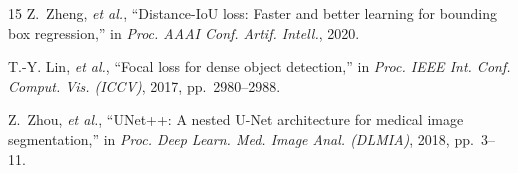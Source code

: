 \documentclass[conference]{IEEEtran}
\begin{document}
\begin{thebibliography}{15}
Z.~Zheng, \emph{et al.}, ``Distance-IoU loss: Faster and better learning for bounding box regression,'' in \emph{Proc. AAAI Conf. Artif. Intell.}, 2020.

T.-Y. Lin, \emph{et al.}, ``Focal loss for dense object detection,'' in \emph{Proc. IEEE Int. Conf. Comput. Vis. (ICCV)}, 2017, pp.~2980--2988.

Z.~Zhou, \emph{et al.}, ``UNet++: A nested U-Net architecture for medical image segmentation,'' in \emph{Proc. Deep Learn. Med. Image Anal. (DLMIA)}, 2018, pp.~3--11.

\end{thebibliography}
\end{document}
